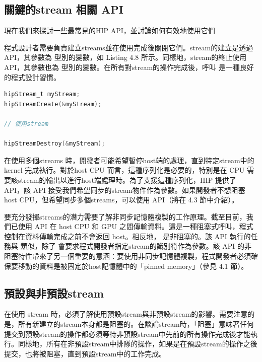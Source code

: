 \subsection{關鍵的stream 相關 API}
現在我們來探討一些最常見的HIP API，並討論如何有效地使用它們

程式設計者需要負責建立streams並在使用完成後關閉它們。stream的建立是透過  API，其參數為  型別的變數，如 Listing 4.8 所示。同樣地，stream的終止使用  API，其參數也為  型別的變數。在所有對stream的操作完成後，呼叫  是一種良好的程式設計習慣。

\begin{lstlisting}[language=C, caption={創建與關閉stream}, label={8th:example}]
hipStream_t myStream;
hipStreamCreate(&myStream);

// 使用stream

hipStreamDestroy(&myStream);
\end{lstlisting}

在使用多個streams 時，開發者可能希望暫停host端的處理，直到特定stream中的 kernel 完成執行。對於host CPU 而言，這種序列化是必要的，特別是在 CPU 需要該stream的輸出以進行host端處理時。為了支援這種序列化，HIP 提供了  API，該 API 接受我們希望同步的stream物件作為參數。如果開發者不想阻塞host CPU，但希望同步多個streams，可以使用  API（將在 4.3 節中介紹）。

要充分發揮streams的潛力需要了解非同步記憶體複製的工作原理。截至目前，我們已使用  API 在 host CPU 和 GPU 之間傳輸資料。這是一種阻塞式呼叫，程式控制在資料傳輸完成之前不會返回 host。相反地， 是非阻塞的。該 API 執行的任務與  類似，除了  會要求程式開發者指定stream的識別符作為參數。該 API 的非阻塞特性帶來了另一個重要的意涵：要使用非同步記憶體複製，程式開發者必須確保要移動的資料是被固定於host記憶體中的「pinned memory」（參見 4.1 節）。

\subsection{預設與非預設stream}
在使用 stream 時，必須了解使用預設stream與非預設stream的影響。需要注意的是，所有新建立的stream本身都是阻塞的。在談論stream時，「阻塞」意味著任何提交到預設stream的操作都必須等待非預設stream中先前的所有操作完成後才能執行。同樣地，所有在非預設stream中排隊的操作，如果是在預設stream的操作之後提交，也將被阻塞，直到預設stream中的工作完成。

